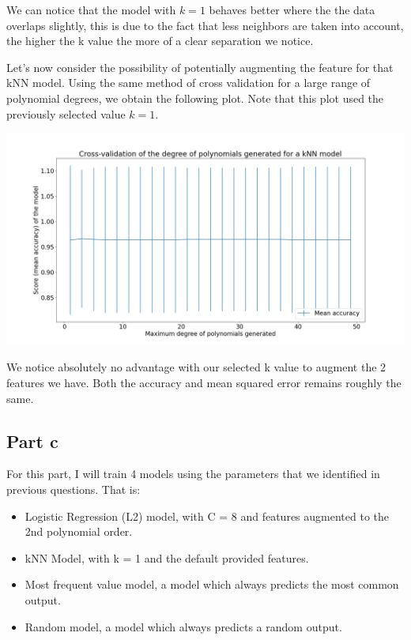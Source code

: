 \documentclass[10pt]{article}
\begin{document}
We can notice that the model with $ k = 1 $ behaves better where the
the data overlaps slightly, this is due to the fact that less neighbors are
taken into account, the higher the k value the more of a clear separation we notice.

Let's now consider the possibility of potentially augmenting the feature for that kNN model.
Using the same method of cross validation for a large range of polynomial degrees, we obtain the following plot.
Note that this plot used the previously selected value $ k = 1 $.

\begin{center}
    \includegraphics[scale=0.25]{ds_1_knn_d_cv.png}
\end{center}
\vspace{5mm} %
We notice absolutely no advantage with our selected k value to augment the 2 features we have.
Both the accuracy and mean squared error remains roughly the same.

\subsection*{Part c}
For this part, I will train 4 models using the parameters that we identified in previous questions.
That is:
\begin{itemize}
    \item Logistic Regression (L2) model, with C = 8 and features augmented to the 2nd polynomial order.
    \item kNN Model, with k = 1 and the default provided features.
    \item Most frequent value model, a model which always predicts the most common output.
    \item Random model, a model which always predicts a random output.
  \end{itemize}
\end{document}
